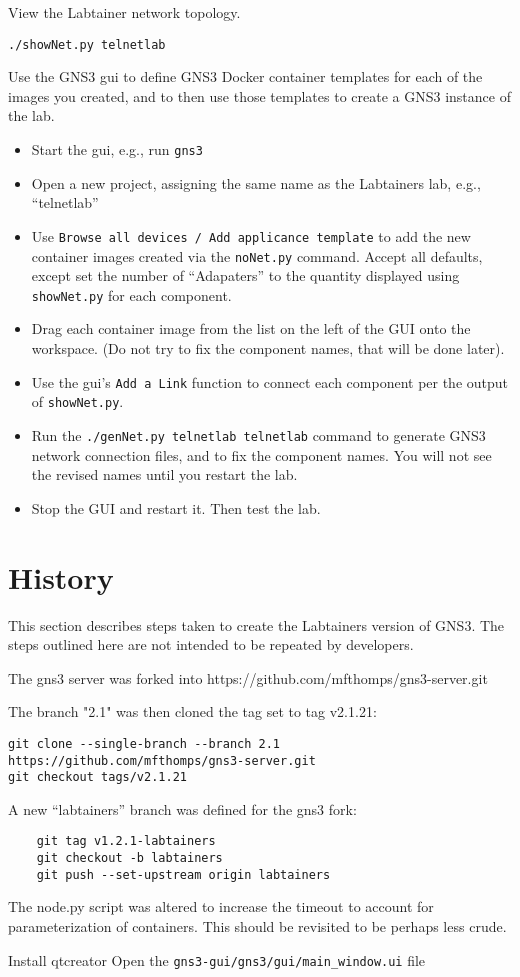 \documentclass[12pt]{article}
\begin{document}
View the Labtainer network topology.
\begin{verbatim}
./showNet.py telnetlab
\end{verbatim}
\noindent Use the GNS3 gui to define GNS3 Docker container templates for each of the 
images you created, and to then use those templates to create a GNS3 instance of 
the lab.
\begin{itemize}
	\item Start the gui, e.g., run {\tt gns3}
	\item Open a new project, assigning the same name as the Labtainers lab, e.g., ``telnetlab''
	\item Use {\tt Browse all devices / Add applicance template} to add the new container images created
		via the {\tt noNet.py} command.  Accept all defaults, except set the number of ``Adapaters'' to
		the quantity displayed using {\tt showNet.py} for each component.
	\item Drag each container image from the list on the left of the GUI onto the workspace.  (Do not try to fix
		the component names, that will be done later).
	\item Use the gui's {\tt Add a Link} function to connect each component per the output of {\tt showNet.py}.
	\item Run the {\tt ./genNet.py telnetlab telnetlab} command to generate GNS3 network connection files, and to
		fix the component names.  You will not see the revised names until you restart the lab.
	\item Stop the GUI and restart it.  Then test the lab.
\end{itemize}

\section{History}
This section describes steps taken to create the Labtainers version of GNS3.
The steps outlined here are not intended to be repeated by developers.

The gns3 server was forked into https://github.com/mfthomps/gns3-server.git

The branch "2.1" was then cloned the tag set to tag v2.1.21:
\begin{verbatim}
git clone --single-branch --branch 2.1 https://github.com/mfthomps/gns3-server.git
git checkout tags/v2.1.21
\end{verbatim}

\noindent A new ``labtainers'' branch was defined for the gns3 fork:
\begin{verbatim}
    git tag v1.2.1-labtainers
    git checkout -b labtainers
    git push --set-upstream origin labtainers
\end{verbatim}

The node.py script was altered to increase the timeout to account for parameterization of
containers.  This should be revisited to be perhaps less crude.

Install qtcreator
Open the {\tt gns3-gui/gns3/gui/main\_window.ui} file
\end{document}
